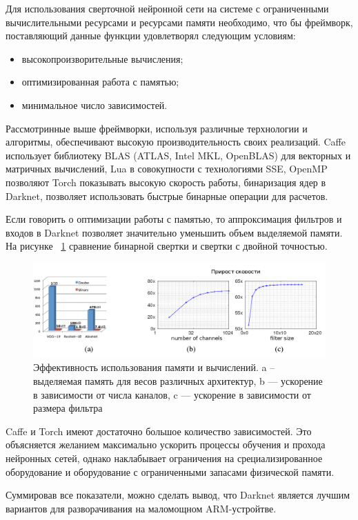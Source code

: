 \documentclass[a4paper,english,russian]{G2-105}
\begin{document}
\ttl
{}
Для использования сверточной нейронной сети на системе с ограниченными вычислительными ресурсами и ресурсами памяти необходимо, что бы фреймворк, поставляющий данные функции удовлетворял следующим условиям:
\begin{itemize}
\item высокопроизворительные вычисления;
\item оптимизированная работа с памятью;
\item минимальное число зависимостей.
\end{itemize}
\par Рассмотринные выше фреймворки, используя различные терхнологии и алгоритмы, обеспечивают высокую производительность своих реализаций. Caffe использует библиотеку BLAS (ATLAS, Intel MKL, OpenBLAS) для векторных и матричных вычислений, Lua в совокупности с технологиями SSE, OpenMP позволяют Torch показывать высокую скорость работы, бинаризация ядер в Darknet, позволяет использовать быстрые бинарные операции для расчетов.
\par Если говорить о оптимизации работы с памятью, то аппроксимация фильтров и входов в Darknet позволяет значительно уменьшить объем выделяемой памяти. На рисунке ~\ref{binary_conv} сравнение бинарной свертки и свертки с двойной точностью.
\begin{figure}
    \includegraphics[width=0.55\paperheight]{binary_conv.png}
    \caption{Эффективность использования памяти и вычислений. a -- выделяемая память для весов различных архитектур, b --- ускорение в зависимости от числа каналов, c --- ускорение в зависимости от размера фильтра}
	\label{binary_conv}
\end{figure}
\par Caffe и Torch имеют достаточно большое количество зависимостей. Это объясняется желанием максимально ускорить процессы обучения и прохода нейронных сетей, однако наклабывает ограничения на срециализированное оборудование и оборудование с ограниченными запасами физической памяти.
\par Суммировав все показатели, можно сделать вывод, что Darknet является лучшим вариантов для разворачивания на маломощном ARM-устройтве.
\end{document}
